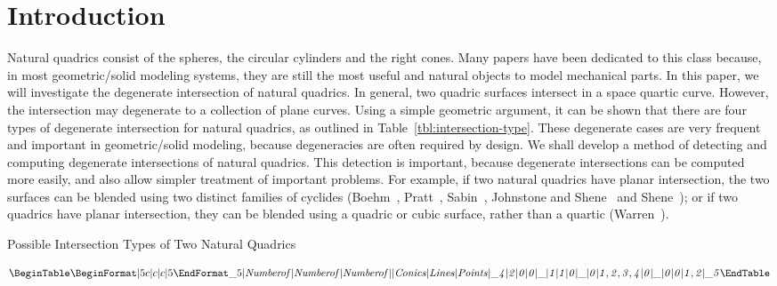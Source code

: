 \section{Introduction}
\label{section:introduction}

     Natural quadrics consist of the spheres, the circular cylinders and
the right cones.  Many papers have been dedicated to this class because, in
most geometric/solid modeling systems, they are still the most useful and
natural objects to model mechanical parts.  In this paper, we will investigate
the degenerate intersection of natural quadrics.
In general, two quadric surfaces intersect in a space quartic curve.
However, the intersection may degenerate to a collection of plane curves.
Using a simple geometric argument, it can be shown that there are
four types of degenerate intersection for natural quadrics, as outlined
in Table~\ref{tbl:intersection-type}.
These degenerate cases are very frequent and important in geometric/solid
modeling,
because degeneracies are often required by design.
We shall develop a method of detecting and computing degenerate intersections
of natural quadrics.
This detection is important, because
degenerate intersections can be computed more easily, and also allow
simpler treatment of important problems.
For example,
if two natural quadrics have planar intersection, the two surfaces can be
blended using two distinct families of cyclides (Boehm~\cite{boehm:1990},
Pratt~\cite{pratt:1990}, Sabin~\cite{sabin},
Johnstone and Shene~\cite{johnstone-shene:1992} and
Shene~\cite{shene:1992,shene:1993a});
or if two quadrics have planar
intersection, they can be blended using a quadric or cubic surface, rather
than a quartic (Warren~\cite{warren:1987,warren:1989}).

\begin{table}
\caption{Possible Intersection Types of Two Natural Quadrics}
\label{tbl:intersection-type}
$$
\BeginTable
     \BeginFormat
     |5 c              | c                    | c             |5
     \EndFormat
     \_5
     | \it Number of | \it Number of | \it Number of | \\
     | \it Conics    | \it Lines     | \it Points    | \\ \_4
     |      2        |       0       |       0       | \\ \_
     |      1        |       1       |       0       | \\ \_
     |      0        | 1, 2, 3, 4    |       0       | \\ \_
     |      0        |       0       |      1,2      | \\
     \_5
\EndTable
$$
\end{table}

